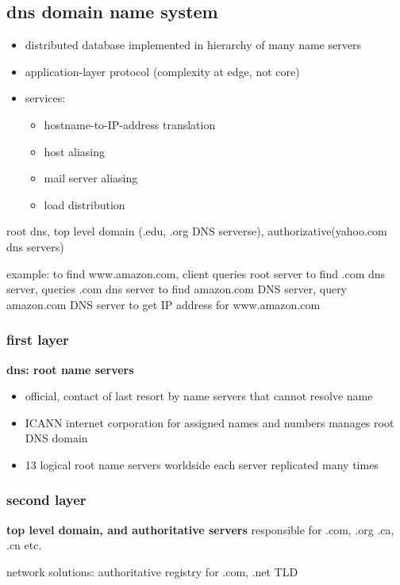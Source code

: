\documentclass[10pt]{article}
\theoremstyle{break}
\begin{document}
\subsection{dns domain name system}
\begin{itemize}
    \item distributed database implemented in hierarchy of many name servers 
    \item application-layer protocol (complexity at edge, not core)
    \item services: \begin{itemize}
        \item hostname-to-IP-address translation 
        \item host aliasing 
        \item mail server aliasing 
        \item load distribution 
    \end{itemize}
\end{itemize}

root dns, top level domain (.edu, .org DNS serverse), authorizative(yahoo.com dns servers)

example: to find www.amazon.com, client queries root server to find .com dns server, queries .com dns server to find amazon.com DNS server, query amazon.com DNS server to get IP address for www.amazon.com

\subsubsection{first layer}
\textbf{dns: root name servers}
\begin{itemize}
    \item  official, contact of last resort by name servers that cannot resolve name 
    \item  ICANN internet corporation for assigned names and numbers manages root DNS domain
    \item 13 logical root name servers worldside each server replicated many times
\end{itemize}

\subsubsection{second layer}
\textbf{top level domain, and authoritative servers}
responsible for .com, .org .ca, .cn etc. 

network solutions: authoritative registry for .com, .net TLD
\end{document}
